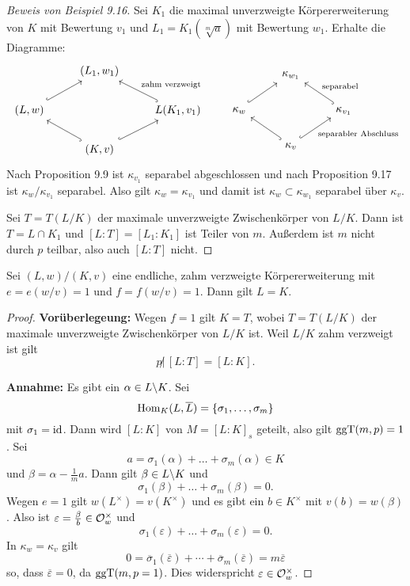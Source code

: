 
\begin{proof}[Beweis von Beispiel 9.16]
	Sei $K_1$ die maximal unverzweigte Körpererweiterung von $K$ mit Bewertung $v_1$
	und $L_1 = K_1(\sqrt[m]{a})$ mit Bewertung $w_1$. Erhalte die Diagramme:
	\[\begin{tikzcd}
	& (L_1,w_1) & \\
	(L,w)
	\arrow[hook]{ur}
	& & L (K_1, v_1)
	\arrow[hook, swap]{ul}{\text{zahm verzweigt}}
	\\
	& (K,v)
	\arrow[hook]{ur}
	\arrow[hook]{ul}
	&
	\end{tikzcd}
	\qquad 
	\begin{tikzcd}
	& \kappa_{w_1} & \\
	\kappa_{w}
	\arrow[hook]{ur}
	& & \kappa_{v_1}
	\arrow[hook, swap]{ul}{\text{separabel}}
	\\
	& \kappa_{v} 
	\arrow[hook, swap]{ur}{\text{separabler Abschluss}}
	\arrow[hook]{ul}
	&
	\end{tikzcd}
	\]
	Nach Proposition 9.9 ist $\kappa_{v_1}$ separabel abgeschlossen und nach Proposition 9.17 ist $\kappa_{w} / \kappa_{v_1}$ separabel. Also gilt $\kappa_{w}=\kappa_{v_1}$ und damit ist
	$\kappa_{w} \subset \kappa_{w_1}$ separabel über $\kappa_{v}$.
	
	\bigskip Sei $T=T(L/K)$ der maximale unverzweigte Zwischenkörper von $L/K$. Dann ist $T= L \cap K_1$ und $[L:T] = [L_1:K_1]$ ist Teiler von $m$. Außerdem ist $m$ nicht durch $p$ teilbar, also auch $[L:T]$ nicht.
\end{proof}

\begin{Prop}
	Sei $(L,w) / (K,v)$ eine endliche, zahm verzweigte Körpererweiterung mit
	$e=e(w/v) =1$ und $f=f(w/v) = 1$. Dann gilt $L=K$.
\end{Prop}

\begin{proof}
	\textbf{Vorüberlegeung:} Wegen $f=1$ gilt $K=T$, wobei $T=T(L/K)$ der maximale unverzweigte Zwischenkörper von $L/K$ ist. Weil $L/K$ zahm verzweigt ist gilt
	\[ p \not| \, [L:T] = [L:K].
	\]
	
	\textbf{Annahme:} Es gibt ein $\alpha \in L \backslash K$. Sei 
	\[ \operatorname{Hom}_K(L, \overline{L}) = \left\{ \sigma_1, \dots, \sigma_m \right\}
	\]
	mit $\sigma_1 = \operatorname{id}$. Dann wird $[L:K]$ von $M=[L:K]_s$ geteilt, also gilt $\operatorname{ggT}(m,p)=1$.
	Sei 
	\[a = \sigma_1(\alpha) + \dots + \sigma_m(\alpha) \in K
	\]
	und $\beta = \alpha - \frac{1}{m} a$.
	Dann gilt $\beta \in L \backslash K$ und 
	\[\sigma_1(\beta) + \dots + \sigma_m(\beta) = 0.
	\]
	Wegen $e=1$ gilt $w(L^\times) = v(K^\times)$ und es gibt ein $b \in K^\times$ mit $v(b)=w(\beta)$.
	Also ist $\varepsilon = \frac{\beta}{b} \in \mathcal{O}_w^\times$ und
	\[ \sigma_1(\varepsilon) + \dots + \sigma_m(\varepsilon) = 0.
	\]
	In $\kappa_w = \kappa_v$ gilt
	\[ 0 = \overline{\sigma}_1(\overline{\varepsilon}) + \cdots + \overline{\sigma}_m(\overline{\varepsilon})
	= m \overline{\varepsilon}
	\]
	so, dass $\overline{\varepsilon} = 0$, da $\operatorname{ggT}(m,p =1)$. Dies widerspricht $\varepsilon \in \mathcal{O}_w^\times$.
\end{proof}


